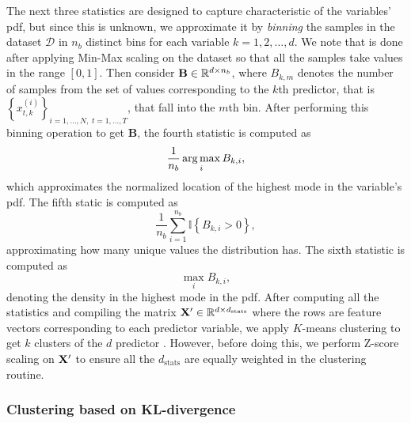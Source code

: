 \documentclass{statsmsc}
\begin{document}
{%
The next three statistics are designed to capture characteristic of the variables' \ac{pdf}, but
since this is unknown, we approximate it by \textit{binning} the samples in the dataset
$\mathcal{D}$ in $n_{{b}}$ distinct bins for each variable $k=1,2,\dots,d$.
We note that is done after applying Min-Max scaling on the dataset so that all the samples take
values in the range $[0,1]$.
Then consider $\mathbf{B} \in \mathbb{R}^{d \times n_b}$,
where $B_{k,m}$ denotes the number of samples from the set of values corresponding to the
$k$th predictor, that is $\left\{x_{t,k}^{(i)} \right\}_{i=1,\dots,N,\;t=1,\dots,T}$,
that fall into the $m$th bin.
After performing this binning operation to get $\mathbf{B}$, the fourth statistic is computed as
\begin{equation}
    \frac{1}{n_{b}}  \operatorname*{arg\,max}_{i} B_{k,i},
\end{equation}
which approximates the normalized location of the highest mode in the variable's \ac{pdf}.
The fifth static is computed as
\begin{equation}
    \frac{1}{n_{b }}  \sum^{n_{b }}_{i=1} \mathbb{I}\left\{
        B_{k,i} > 0
    \right\},
\end{equation}
approximating how many unique values the distribution has. The sixth statistic is computed as
\begin{equation}
     \max_{i} B_{k,i},
\end{equation}
denoting the density in the highest mode in the \ac{pdf}.
After computing all the statistics and compiling the matrix
$\mathbf{X}' \in \mathbb{R}^{d \times d_{\textrm{stats} }}$ where the rows are feature vectors corresponding
to each predictor variable, we apply $K$-means clustering to get $k$ clusters
of the $d$ predictor \citep{kmeans}. However, before doing this, we perform Z-score scaling
on $\mathbf{X}'$ to ensure all the $d_{\textrm{stats}}$ are equally weighted in the clustering
routine.

\subsubsection{Clustering based on KL-divergence}%
\label{sub:Clustering based on KL-divergence}

}
\end{document}
